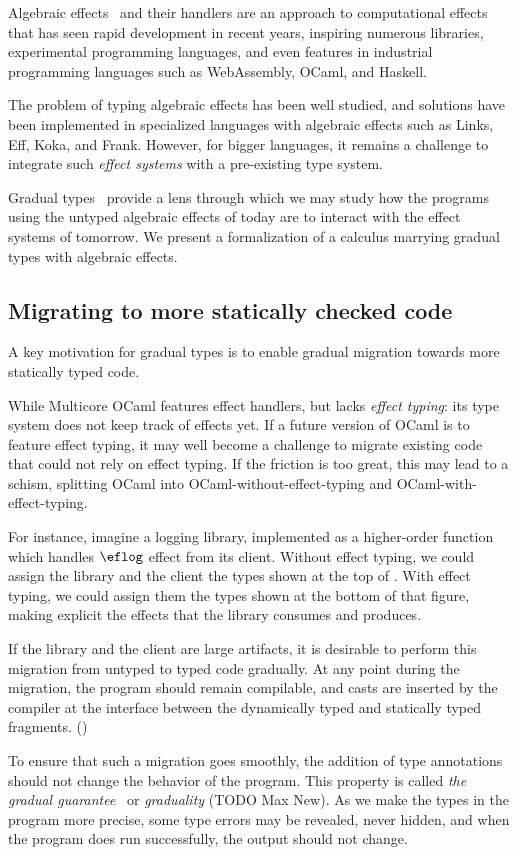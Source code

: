 Algebraic effects~\citep{plotkin2001semantics} and their handlers are an
approach to computational effects that has seen rapid development in recent
years, inspiring numerous libraries, experimental programming languages,
and even features in industrial programming languages such as WebAssembly, OCaml,
and Haskell.

The problem of typing algebraic effects has been well studied, and solutions
have been implemented in specialized languages with algebraic effects such as
Links, Eff, Koka, and Frank. However, for bigger languages, it remains a
challenge to integrate such \emph{effect systems} with a pre-existing type
system.

Gradual types~\citep{siek2015} provide a lens through which we may study how
the programs using the untyped algebraic effects of today are to interact with
the effect systems of tomorrow. We present a formalization of a
calculus marrying gradual types with algebraic effects.

\subsection{Migrating to more statically checked code}

A key motivation for gradual types is to enable gradual migration
towards more statically typed code.

While Multicore OCaml features effect handlers, but lacks \emph{effect typing}:
its type system does not keep track of effects yet.
If a future version of OCaml is to feature effect typing,
it may well become a challenge to migrate existing code that could
not rely on effect typing. If the friction is too great, this may lead
to a schism, splitting OCaml into OCaml-without-effect-typing and
OCaml-with-effect-typing.

For instance, imagine a logging library, implemented as a higher-order function
which handles $\eflog$ effect from its client. Without effect typing, we could
assign the library and the client the types shown at the top of .
With effect typing, we could assign them the types shown at the bottom of that figure,
making explicit the effects that the library consumes and produces.

If the library and the client are large artifacts, it is desirable to
perform this migration from untyped to typed code gradually.
At any point during the migration, the program should remain compilable, and
casts are inserted by the compiler at the interface between the dynamically
typed and statically typed fragments. ()

To ensure that such a migration goes smoothly, the addition of type annotations
should not change the behavior of the program. This property
is called \emph{the gradual guarantee}~\citep{siek2015} or \emph{graduality} (TODO Max New).
As we make the types in the program more precise, some type errors may be
revealed, never hidden, and when the program does run successfully, the output
should not change.
